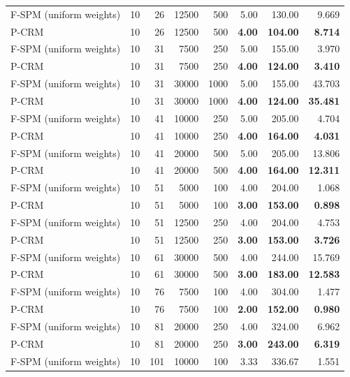 \begin{tabular}{lrrrrrrr}
\midrule
F-SPM (uniform weights) & 10 & 26 & 12500 & 500 & 5.00 & 130.00 & 9.669 \\
P-CRM & 10 & 26 & 12500 & 500 & \textbf{4.00} & \textbf{104.00} & \textbf{8.714} \\
\midrule
F-SPM (uniform weights) & 10 & 31 & 7500 & 250 & 5.00 & 155.00 & 3.970 \\
P-CRM & 10 & 31 & 7500 & 250 & \textbf{4.00} & \textbf{124.00} & \textbf{3.410} \\
\midrule
F-SPM (uniform weights) & 10 & 31 & 30000 & 1000 & 5.00 & 155.00 & 43.703 \\
P-CRM & 10 & 31 & 30000 & 1000 & \textbf{4.00} & \textbf{124.00} & \textbf{35.481} \\
\midrule
F-SPM (uniform weights) & 10 & 41 & 10000 & 250 & 5.00 & 205.00 & 4.704 \\
P-CRM & 10 & 41 & 10000 & 250 & \textbf{4.00} & \textbf{164.00} & \textbf{4.031} \\
\midrule
F-SPM (uniform weights) & 10 & 41 & 20000 & 500 & 5.00 & 205.00 & 13.806 \\
P-CRM & 10 & 41 & 20000 & 500 & \textbf{4.00} & \textbf{164.00} & \textbf{12.311} \\
\midrule
F-SPM (uniform weights) & 10 & 51 & 5000 & 100 & 4.00 & 204.00 & 1.068 \\
P-CRM & 10 & 51 & 5000 & 100 & \textbf{3.00} & \textbf{153.00} & \textbf{0.898} \\
\midrule
F-SPM (uniform weights) & 10 & 51 & 12500 & 250 & 4.00 & 204.00 & 4.753 \\
P-CRM & 10 & 51 & 12500 & 250 & \textbf{3.00} & \textbf{153.00} & \textbf{3.726} \\
\midrule
F-SPM (uniform weights) & 10 & 61 & 30000 & 500 & 4.00 & 244.00 & 15.769 \\
P-CRM & 10 & 61 & 30000 & 500 & \textbf{3.00} & \textbf{183.00} & \textbf{12.583} \\
\midrule
F-SPM (uniform weights) & 10 & 76 & 7500 & 100 & 4.00 & 304.00 & 1.477 \\
P-CRM & 10 & 76 & 7500 & 100 & \textbf{2.00} & \textbf{152.00} & \textbf{0.980} \\
\midrule
F-SPM (uniform weights) & 10 & 81 & 20000 & 250 & 4.00 & 324.00 & 6.962 \\
P-CRM & 10 & 81 & 20000 & 250 & \textbf{3.00} & \textbf{243.00} & \textbf{6.319} \\
\midrule
F-SPM (uniform weights) & 10 & 101 & 10000 & 100 & 3.33 & 336.67 & 1.551 \\

\end{tabular}
